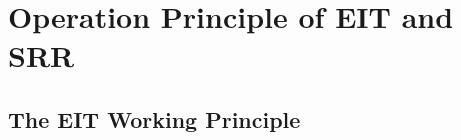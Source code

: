 \documentclass[10pt]{IEEEtran}
\begin{document}








\section{Operation Principle of EIT and SRR}
\label{sec:prelim_eit_srr}


\subsection{The EIT Working Principle}
\label{sec:prelim_eit}
\end{document}
